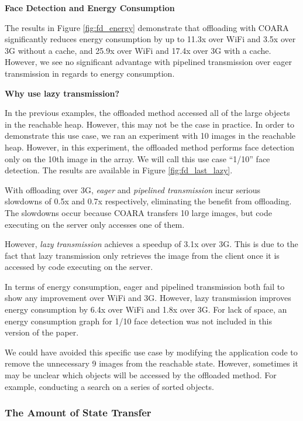 \documentclass[10pt,journal,cspaper,compsoc]{IEEEtran}
\begin{document}
{\textbf{Face Detection and Energy Consumption}

The results in Figure \ref{fig:fd_energy} demonstrate that offloading with COARA significantly reduces energy consumption by up to 11.3x over WiFi and 3.5x over 3G without a cache, and 25.9x over WiFi and 17.4x over 3G with a cache.  However, we see no significant advantage with pipelined transmission over eager transmission in regards to energy consumption.




\textbf{Why use lazy transmission?}

In the previous examples, the offloaded method accessed all of the large objects in the reachable heap.  However, this may not be the case in practice.  In order to demonstrate this use case, we ran an experiment with 10 images in the reachable heap. However, in this experiment, the offloaded method performs face detection only on the 10th image in the array.  We will call this use case ``1/10'' face detection. The results are available in Figure \ref{fig:fd_last_lazy}.

With offloading over 3G, \emph{eager} and \emph{pipelined transmission} incur serious slowdowns of 0.5x and 0.7x respectively, eliminating the benefit from offloading.  The slowdowns occur because COARA transfers 10 large images, but code executing on the server only accesses one of them.

However, \emph{lazy transmission} achieves a speedup of 3.1x over 3G.  This is due to the fact that lazy transmission only retrieves the image from the client once it is accessed by code executing on the server.

In terms of energy consumption, eager and pipelined transmission both fail to
show any improvement over WiFi and 3G. However, lazy transmission improves energy consumption by 6.4x over WiFi and 1.8x over 3G. For lack of space, an energy consumption graph for 1/10 face detection was not included in this version of the paper.

We could have avoided this specific use case by modifying the application code to remove the unnecessary 9 images from the reachable state. However, sometimes it may be unclear which objects will be accessed by the offloaded method.  For example, conducting a search on a series of sorted objects.




\subsubsection{The Amount of State Transfer}


}
\end{document}
